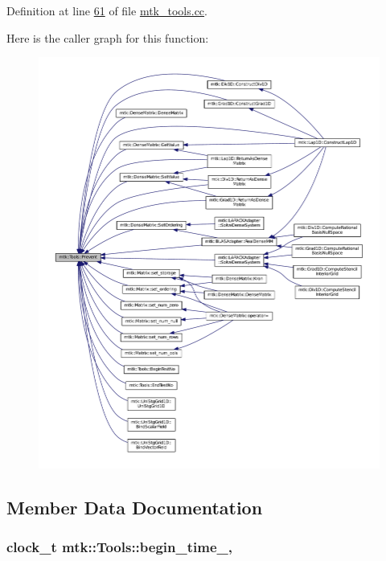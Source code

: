 Definition at line \hyperlink{mtk__tools_8cc_source_l00061}{61} of file \hyperlink{mtk__tools_8cc_source}{mtk\-\_\-tools.\-cc}.



Here is the caller graph for this function\-:\nopagebreak
\begin{figure}[H]
\begin{center}
\leavevmode
\includegraphics[width=350pt]{classmtk_1_1Tools_acbcff02946d3db565d53ecbcc459f0b5_icgraph}
\end{center}
\end{figure}




\subsection{Member Data Documentation}
\hypertarget{classmtk_1_1Tools_a4bd58d08397db42271ed9e2d3ecc9963}{
\subsubsection[{begin\-\_\-time\-\_\-}]{\setlength{\rightskip}{0pt plus 5cm}clock\-\_\-t mtk\-::\-Tools\-::begin\-\_\-time\-\_\-\hspace{0.3cm}{\ttfamily [static]}, {\ttfamily [private]}}}\label{classmtk_1_1Tools_a4bd58d08397db42271ed9e2d3ecc9963}


